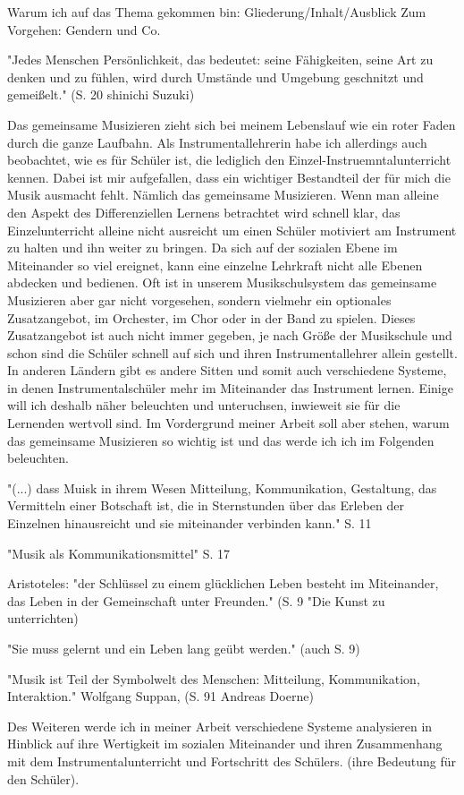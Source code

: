 

Warum ich auf das Thema gekommen bin:
Gliederung/Inhalt/Ausblick
Zum Vorgehen: Gendern und Co. 


"Jedes Menschen Persönlichkeit, das bedeutet: seine Fähigkeiten, seine Art zu
denken und zu fühlen, wird durch Umstände und Umgebung geschnitzt und
gemeißelt." (S. 20 shinichi Suzuki)

Das gemeinsame Musizieren zieht sich bei meinem Lebenslauf wie ein roter Faden
durch die ganze Laufbahn. Als Instrumentallehrerin habe ich allerdings auch
beobachtet, wie es für Schüler ist, die lediglich den
Einzel-Instruemntalunterricht kennen. Dabei ist mir aufgefallen, dass ein
wichtiger Bestandteil der für mich die Musik ausmacht fehlt. Nämlich das
gemeinsame Musizieren. Wenn man alleine den Aspekt des
Differenziellen Lernens betrachtet wird schnell klar, das Einzelunterricht
alleine nicht ausreicht um einen Schüler motiviert am Instrument zu halten und
ihn weiter zu bringen. Da sich auf der sozialen Ebene im Miteinander so viel
ereignet, kann eine einzelne Lehrkraft nicht alle Ebenen abdecken und bedienen.
Oft ist in unserem Musikschulsystem das gemeinsame Musizieren aber gar nicht
vorgesehen, sondern vielmehr ein optionales Zusatzangebot, im Orchester, im Chor
oder in der Band zu spielen. Dieses Zusatzangebot ist auch nicht immer gegeben,
je nach Größe der Musikschule und schon sind die Schüler schnell auf sich und
ihren Instrumentallehrer allein gestellt. In anderen Ländern gibt es andere
Sitten und somit auch verschiedene Systeme, in denen Instrumentalschüler mehr im
Miteinander das Instrument lernen. Einige will ich deshalb näher beleuchten und
unteruchsen, inwieweit sie für die Lernenden wertvoll sind. Im Vordergrund
meiner Arbeit soll aber stehen, warum das gemeinsame Musizieren so
wichtig ist und das werde ich ich im Folgenden beleuchten. 


"(...) dass Muisk in ihrem Wesen Mitteilung, Kommunikation, Gestaltung, das
Vermitteln einer Botschaft ist, die in Sternstunden über das Erleben der
Einzelnen hinausreicht und sie miteinander verbinden kann." S. 11

"Musik als Kommunikationsmittel" S. 17

Aristoteles: "der Schlüssel zu einem glücklichen Leben besteht im Miteinander,
das Leben in der Gemeinschaft unter Freunden." (S. 9 "Die Kunst zu unterrichten)

"Sie muss gelernt und ein Leben lang geübt werden." (auch S. 9)


"Musik ist Teil der Symbolwelt des Menschen: Mitteilung, Kommunikation,
Interaktion." Wolfgang Suppan, (S. 91 Andreas Doerne)

Des Weiteren werde ich in meiner Arbeit verschiedene Systeme analysieren in
Hinblick auf ihre Wertigkeit im sozialen Miteinander und ihren Zusammenhang mit
dem Instrumentalunterricht und Fortschritt des Schülers. (ihre Bedeutung für den
Schüler). 
